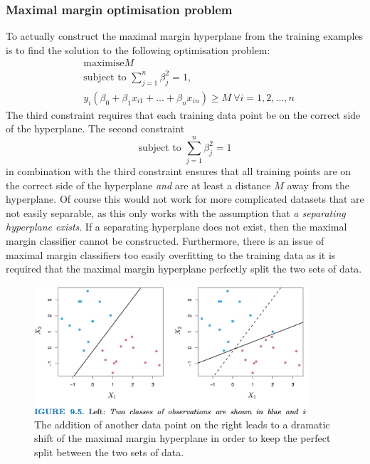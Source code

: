 \documentclass[CS5104-Notes.tex]{subfiles}
\begin{document}
\subsubsection{Maximal margin optimisation problem}
To actually construct the maximal margin hyperplane from the training examples is to find the solution to the following optimisation problem:
\begin{align}
  &\text{maximise} M \\
  &\text{subject to } \sum_{j=1}^{n}\beta_{j}^{2} = 1, \\
  &y_{i}(\beta_{0} + \beta_{1}x_{i1} + ... + \beta_{n}x_{in}) \geq M\ \forall i = 1,2,...,n
\end{align}
The third constraint requires that each training data point be on the correct side of the hyperplane.  The second constraint
\begin{equation*}
\text{subject to } \sum_{j=1}^{n}\beta_{j}^{2} = 1
\end{equation*}
in combination with the third constraint ensures that all training points are on the correct side of the hyperplane \textit{and} are at least a distance $M$ away from the hyperplane.
\n
Of course this would not work for more complicated datasets that are not easily separable, as this only works with the assumption that \textit{a separating hyperplane exists}. If a separating hyperplane does not exist, then the maximal margin classifier cannot be constructed. Furthermore, there is an issue of maximal margin classifiers too easily overfitting to the training data as it is required that the maximal margin hyperplane perfectly split the two sets of data.
\begin{figure}[H]
  \centering
  \includegraphics[width=0.9\textwidth, keepaspectratio]{imgs/maximal-margin-problem.png}
  \caption{The addition of another data point on the right leads to a dramatic shift of the maximal margin hyperplane in order to keep the perfect split between the two sets of data.}
\end{figure}
\end{document}
